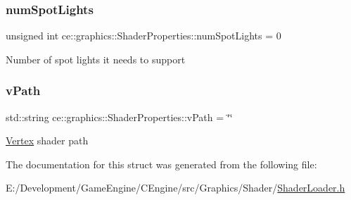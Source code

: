 \subsubsection{\texorpdfstring{num\+Spot\+Lights}{numSpotLights}}
{\footnotesize\ttfamily unsigned int ce\+::graphics\+::\+Shader\+Properties\+::num\+Spot\+Lights = 0}

Number of spot lights it needs to support \mbox{\label{structce_1_1graphics_1_1_shader_properties_a7c292a15c7a6d732c23a859448fadef9}} 
\subsubsection{\texorpdfstring{v\+Path}{vPath}}
{\footnotesize\ttfamily std\+::string ce\+::graphics\+::\+Shader\+Properties\+::v\+Path = \char`\"{}\char`\"{}}

\hyperlink{structce_1_1graphics_1_1_vertex}{Vertex} shader path 

The documentation for this struct was generated from the following file\+:\begin{DoxyCompactItemize}
\item 
E\+:/\+Development/\+Game\+Engine/\+C\+Engine/src/\+Graphics/\+Shader/\hyperlink{_shader_loader_8h}{Shader\+Loader.\+h}\end{DoxyCompactItemize}
